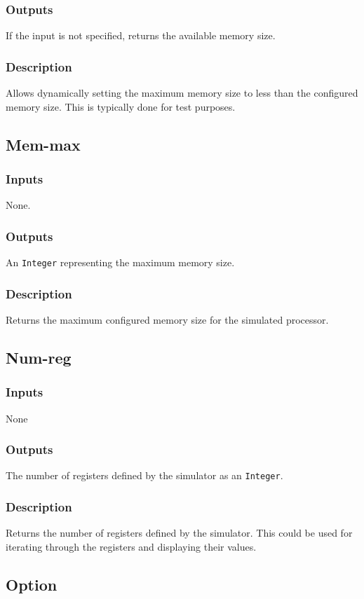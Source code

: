 \documentclass[10pt, openany]{book}
\newcommand{\datatype}[1]{\texttt{#1}}
\begin{document}
\subsubsection{Outputs}
If the input is not specified, returns the available memory size.
\subsubsection{Description}
Allows dynamically setting the maximum memory size to less than the configured memory size.
This is typically done for test purposes.

\subsection{Mem-max}
\subsubsection{Inputs}
None.
\subsubsection{Outputs}
An \datatype{Integer} representing the maximum memory size.
\subsubsection{Description}
Returns the maximum configured memory size for the simulated processor.

\subsection{Num-reg}
\subsubsection{Inputs}
None
\subsubsection{Outputs}
The number of registers defined by the simulator as an \datatype{Integer}.
\subsubsection{Description}
Returns the number of registers defined by the simulator.
This could be used for iterating through the registers and displaying their values.

\subsection{Option}
\end{document}
